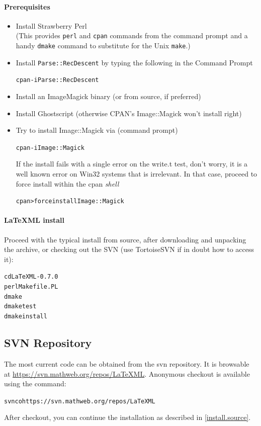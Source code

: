 \documentclass{article}
\begin{document}
\paragraph{Prerequisites}
\begin{itemize}
\item Install  Strawberry Perl\\
  (This provides \texttt{perl} and \texttt{cpan} commands from the command prompt
   and a handy \texttt{dmake} command to substitute for the Unix \texttt{make}.) 
\item Install \texttt{Parse::RecDescent} by typing the following in the Command Prompt
\begin{alltt}
  cpan -i Parse::RecDescent
\end{alltt}
\item Install an  ImageMagick binary (or from source, if preferred)
\item Install  Ghostscript (otherwise CPAN's Image::Magick won't install right)
\item Try to install Image::Magick via (command prompt)
\begin{alltt}
  cpan -i Image::Magick
\end{alltt}
 If the install fails with a single error on the write.t test, don't worry,
it is a well known error on Win32 systems that is irrelevant.
In that case, proceed to force install within the cpan \emph{shell}
\begin{alltt}
  cpan> force install Image::Magick
\end{alltt}
\end{itemize}
\paragraph{LaTeXML install}
Proceed with the typical install from source, after downloading and unpacking the archive, or checking out the SVN (use TortoiseSVN if in doubt how to access it):
\begin{alltt}
 cd LaTeXML-0.7.0
 perl Makefile.PL
 dmake
 dmake test
 dmake install
\end{alltt}

\subsection{SVN Repository}\label{download.svn}
The most current code can be obtained from the svn repository.
It is browsable at \url{https://svn.mathweb.org/repos/LaTeXML}.
Anonymous checkout is available using the command:
\begin{alltt}
  svn co https://svn.mathweb.org/repos/LaTeXML
\end{alltt}
After checkout, you can continue the installation
as described in \ref{install.source}.
\end{document}
